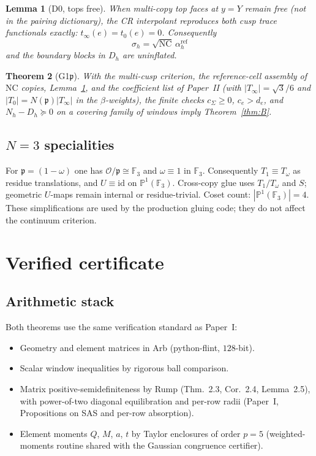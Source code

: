 \documentclass[11pt]{amsart}
\newtheorem{theorem}{Theorem}[section]
\newtheorem{lemma}[theorem]{Lemma}
\newcommand{\p}{\mathfrak{p}}
\begin{document}
\begin{lemma}[D0, tops free]\label{lem:D0}
When multi-copy top faces at $y=Y$ remain free (not in the pairing
dictionary), the CR interpolant reproduces both cusp trace functionals
exactly: $t_\infty(e)=t_0(e)=0$.  Consequently
\[
  \sigma_h=\sqrt{\mathrm{NC}}\,\alpha_h^{\mathrm{ref}}
\]
and the boundary blocks in $D_h$ are uninflated.
\end{lemma}

\begin{theorem}[G1$\p$]\label{thm:G1p}
With the multi-cusp criterion, the reference-cell assembly of
$\mathrm{NC}$ copies, Lemma~\ref{lem:D0}, and the coefficient list of
Paper~II (with $|T_\infty|=\sqrt{3}/6$ and $|T_0|=N(\p)|T_\infty|$ in the
$\beta$-weights), the finite checks $c_\Sigma\ge 0$, $c_e>d_e$, and
$N_h-D_h\succeq 0$ on a covering family of windows imply
Theorem~\ref{thm:B}.
\end{theorem}

\subsection{$N=3$ specialities}

For $\p=(1-\omega)$ one has $\mathcal{O}/\p\cong\mathbb{F}_3$ and
$\omega\equiv 1$ in $\mathbb{F}_3$.  Consequently $T_1\equiv T_\omega$ as
residue translations, and $U\equiv\mathrm{id}$ on $\mathbb{P}^1(\mathbb{F}_3)$.
Cross-copy glue uses $T_1/T_\omega$ and $S$; geometric $U$-maps remain
internal or residue-trivial.  Coset count: $|\mathbb{P}^1(\mathbb{F}_3)|=4$.
These simplifications are used by the production gluing code; they do not
affect the continuum criterion.

\section{Verified certificate}\label{sec:cert}

\subsection{Arithmetic stack}

Both theorems use the same verification standard as Paper~I:
\begin{itemize}
\item Geometry and element matrices in Arb (python-flint, $128$-bit).
\item Scalar window inequalities by rigorous ball comparison.
\item Matrix positive-semidefiniteness by Rump \cite{Rump06}
  (Thm.~2.3, Cor.~2.4, Lemma~2.5), with power-of-two diagonal
  equilibration and per-row radii (Paper~I, Propositions on SAS and
  per-row absorption).
\item Element moments $Q$, $M$, $a$, $t$ by Taylor enclosures of order
  $p=5$ (weighted-moments routine shared with the Gaussian
  congruence certifier).
\end{itemize}
\end{document}
